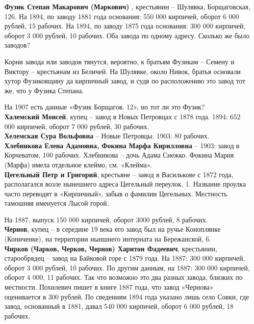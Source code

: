 \noindent\textbf{Фузик Степан Макарович (Маркович)} , крестьянин – Шулявка, Борщаговская, 126. На 1894, по заводу 1881 года основания: 550 000 кирпичей, оборот 6 000 рублей, 15 рабочих. На 1894, по заводу 1875 года основания: 300 000 кирпичей, оборот 3 000 рублей, 10 рабочих. Оба завода по одному адресу. Сколько же было заводов?

Корни завода или заводов тянутся, вероятно, к братьям Фузикам – Семену и Виктору – крестьянам из Беличей. На Шулявке, около Нивок, братья основали хутор Фузиковщину да кирпичный завод, и судя по расположению это завод тот же, что у Фузика Степана.

На 1907 есть данные «Фузик Борщагов. 12», но тот ли это Фузик?\\

\noindent\textbf{Халемский Моисей}, купец – завод в Новых Петровцах с 1878 года. 1894: 652 000 кирпичей, оборот 7 000 рублей, 30 рабочих.\\

\noindent\textbf{Хелемская Сура Вольфовна} – Новые Петровцы. 1903: 80 рабочих.\\

\noindent\textbf{Хлебникова Елена Адамовна, Фокина Марфа Кирилловна} – 1903: завод в Корчеватом, 100 рабочих. Хлебникова – дочь Адама Снежко. Фокина Мария (Марфа) имела отдельное клеймо, см. «Клейма».\\

\noindent\textbf{Цегельный Петр и Григорий}, крестьяне – завод в Василькове с 1872 года, располагался возле нынешнего адреса Цегельный переулок, 1. Название проулка часто переводят в «Кирпичный», забыв о фамилии Цегельных. Местность тамошняя именуется Лысой горой.

На 1887, выпуск 150 000 кирпичей, оборот 3000 рублей, 8 рабочих.\\

\noindent\textbf{Чернов}, купец – в середине 19 века его завод был на ручье Коноплянке (Кониченке), на территории ныншнего интерната на Бережанской, 6.\\

\noindent\textbf{Чирков (Чарков, Черков, Чернов) Харитон Фадеевич}, крестьянин, старообрядец – завод на Байковой горе с 1879 года. На 1887: 300 000 кирпичей, оборот 3 000 рублей, 10 рабочих. По другим данным, на 1887: 300 000 кирпичей, оборот 4 000, 11 рабочих. Так что возможно это два разных завода, близких по местности. Похилевич пишет в книге 1887 года, что завод «Чернова» оценивается в 300 рублей. По сведениям 1894 года указано лишь село Совки, где завод, основанный в 1881, давал 540 000 кирпичей, оборот 6 000 рублей, 18 рабочих.

